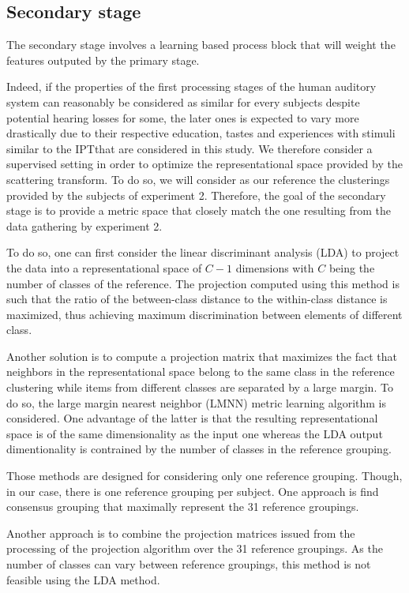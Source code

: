 \documentclass{article}
\newcommand{\ipt}{IPT}
\begin{document}
\subsection{Secondary stage}

The secondary stage involves a learning based process block that will weight the features outputed by the primary stage.

Indeed, if the properties of the first processing stages of the human auditory system can reasonably be considered as similar for every subjects despite potential hearing losses for some, the later ones is expected to vary more drastically due to their respective education, tastes and experiences with stimuli similar to the \ipt that are considered in this study. We therefore consider a supervised setting in order to optimize the representational space provided by the scattering transform. To do so, we will consider as our reference the clusterings provided by the subjects of experiment 2. Therefore, the goal of the secondary stage is to provide a metric space that closely match the one resulting from the data gathering by experiment 2.

To do so, one can first consider the linear discriminant analysis (LDA) \cite{duda2000pattern} to project the data into a representational space of $C-1$ dimensions with $C$ being the number of classes of the reference. The projection computed using this method is such that the ratio of the between-class distance
to the within-class distance is maximized, thus achieving maximum discrimination between elements of different class.

Another solution is to compute a projection matrix that maximizes the fact that neighbors in the representational space belong to the same class in the reference clustering while items from different classes are separated by a large margin. To do so, the large margin nearest neighbor (LMNN) metric learning algorithm \cite{weinberger2006distance, weinberger2009distance} is considered. One advantage of the latter is that the resulting representational space is of the same dimensionality as the input one whereas the LDA output dimentionality is contrained by the number of classes in the reference grouping.

Those methods are designed for considering only one reference grouping. Though, in our case, there is one reference grouping per subject. One approach is find consensus grouping that maximally represent the 31 reference groupings.

Another approach is to combine the projection matrices issued from the processing of the projection algorithm over the 31 reference groupings. As the number of classes can vary between reference groupings, this method is not feasible using the LDA method.
\end{document}
